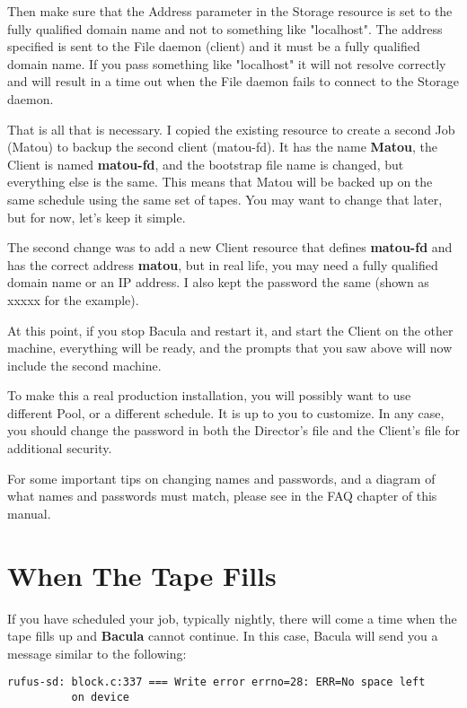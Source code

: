 Then make sure that the Address parameter in the Storage resource is set to
the fully qualified domain name and not to something like "localhost". The
address specified is sent to the File daemon (client) and it must be a fully
qualified domain name. If you pass something like "localhost" it will not
resolve correctly and will result in a time out when the File daemon fails to
connect to the Storage daemon. 

That is all that is necessary. I copied the existing resource to create a
second Job (Matou) to backup the second client (matou-fd). It has the name
{\bf Matou}, the Client is named {\bf matou-fd}, and the bootstrap file name
is changed, but everything else is the same. This means that Matou will be
backed up on the same schedule using the same set of tapes. You may want to
change that later, but for now, let's keep it simple. 

The second change was to add a new Client resource that defines {\bf matou-fd}
and has the correct address {\bf matou}, but in real life, you may need a
fully qualified domain name or an IP address. I also kept the password the
same (shown as xxxxx for the example). 

At this point, if you stop Bacula and restart it, and start the Client on the
other machine, everything will be ready, and the prompts that you saw above
will now include the second machine. 

To make this a real production installation, you will possibly want to use
different Pool, or a different schedule. It is up to you to customize. In any
case, you should change the password in both the Director's file and the
Client's file for additional security. 

For some important tips on changing names and passwords, and a diagram of what
names and passwords must match, please see 
 in the FAQ chapter
of this manual. 

\section{When The Tape Fills}
\label{FullTape}

If you have scheduled your job, typically nightly, there will come a time when
the tape fills up and {\bf Bacula} cannot continue. In this case, Bacula will
send you a message similar to the following: 

\footnotesize
\begin{verbatim}
rufus-sd: block.c:337 === Write error errno=28: ERR=No space left
          on device
\end{verbatim}
\normalsize

